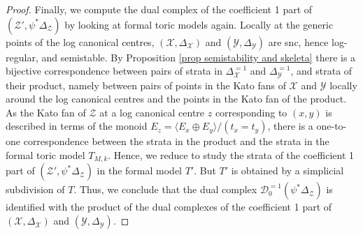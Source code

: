 \documentclass{amsart}%
\numberwithin{equation}{subsection}
\theoremstyle{plain2}
\theoremstyle{definition2}
\theoremstyle{stepstyle}
\theoremstyle{point}
\theoremstyle{subpoint}
\newcommand{\D}{{\mathcal D}}
\newcommand{\cX}{\ensuremath{\mathscr{X}}}
\newcommand{\cY}{\ensuremath{\mathscr{Y}}}
\newcommand{\cZ}{\ensuremath{\mathscr{Z}}}
\renewcommand{\cY}{\ensuremath{\mathscr{Y}}}
\begin{document}
\begin{proof}
Finally, we compute the dual complex of the coefficient 1 part of $(\cZ', \psi^*\Delta_\cZ)$ by looking at formal toric models again. Locally at the generic points of the log canonical centres, $(\cX,\Delta_{\cX})$ and $(\cY,\Delta_{\cY})$ are snc, hence log-regular, and semistable. By Proposition \ref{prop semistability and skeleta} there is a bijective correspondence between pairs of strata in $\Delta_{\cX}^{=1}$ and $\Delta_{\cY}^{=1}$, and strata of their product, namely between pairs of points in the Kato fans of $\cX$ and $\cY$ locally around the log canonical centres and the points in the Kato fan of the product. As the Kato fan of $\cZ$ at a log canonical centre $z$ corresponding to $(x,y)$ is described in terms of the monoid $E_z = \langle E_x \oplus E_y \rangle /(t_x=t_y)$, there is a one-to-one correspondence between the strata in the product and the strata in the formal toric model $T_{M,k}$. Hence, we reduce to study the strata of the coefficient 1 part of $(\cZ',\psi^*\Delta_\cZ )$ in the formal model $T'$. But $T'$ is obtained by a simplicial subdivision of $T$. Thus, we conclude that the dual complex $\D^{=1}_0(\psi^*\Delta_\cZ)$ is identified with the product of the dual complexes of the coefficient 1 part of $(\cX,\Delta_{\cX})$ and $(\cY,\Delta_{\cY})$.
\end{proof}
\end{document}
